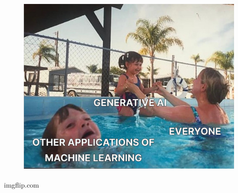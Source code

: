 \begin{frame}[t]
{\begin{minipage}[b]{\textwidth}
\begin{minipage}[b]{0.33\textwidth}
\begin{figure}[ht]
                \includegraphics[width=\textwidth]{img/meme-3-cut.jpeg}
            \end{figure}
            \begin{flushright}
                \vspace*{-7pt}
                {\tiny\textsuperscript{\textcopyright}imgflip.com}
            \end{flushright}
        \end{minipage}
        \begin{minipage}[b]{0.33\textwidth}
            \centering
            \begin{figure}[ht]

\end{figure}
\end{minipage}
\end{minipage}}
\end{frame}
